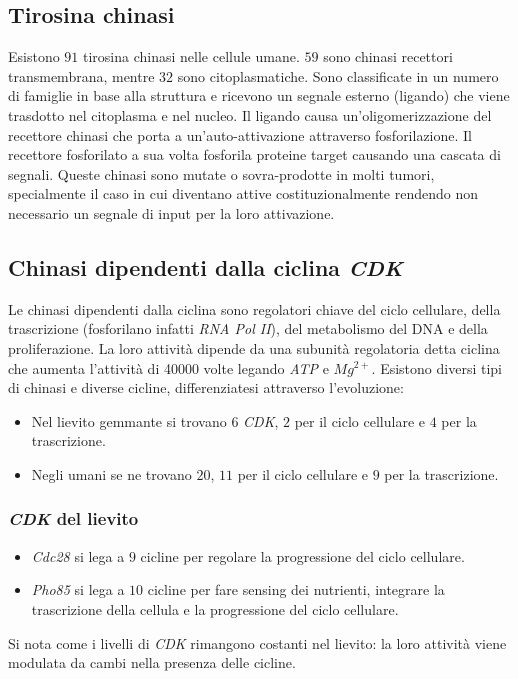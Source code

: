 	\subsection{Tirosina chinasi}
	Esistono $91$ tirosina chinasi nelle cellule umane. 
	$59$ sono chinasi recettori transmembrana, mentre $32$ sono citoplasmatiche. 
	Sono classificate in un numero di famiglie in base alla struttura e ricevono un segnale esterno (ligando) che viene trasdotto nel citoplasma e nel nucleo.
	Il ligando causa un'oligomerizzazione del recettore chinasi che porta a un'auto-attivazione attraverso fosforilazione. 
	Il recettore fosforilato a sua volta fosforila proteine target causando una cascata di segnali. 
	Queste chinasi sono mutate o sovra-prodotte in molti tumori, specialmente il caso in cui diventano attive costituzionalmente rendendo non necessario un segnale di input per la loro attivazione.

	\subsection{Chinasi dipendenti dalla ciclina \emph{CDK}}
	Le chinasi dipendenti dalla ciclina sono regolatori chiave del ciclo cellulare, della trascrizione (fosforilano infatti \emph{RNA Pol II}), del metabolismo del DNA e della proliferazione. 
	La loro attivit\`a dipende da una subunit\`a regolatoria detta ciclina che aumenta l'attivit\`a di \num{40000} volte legando \emph{ATP} e \emph{$Mg^{2+}$}.
	Esistono diversi tipi di chinasi e diverse cicline, differenziatesi attraverso l'evoluzione:
	\begin{itemize}
		\item Nel lievito gemmante si trovano $6$ \emph{CDK}, $2$ per il ciclo cellulare e $4$ per la trascrizione.
		\item Negli umani se ne trovano $20$, $11$ per il ciclo cellulare e $9$ per la trascrizione.
	\end{itemize}
		
		\subsubsection{\emph{CDK} del lievito}
		\begin{itemize}
			\item \emph{Cdc28} si lega a $9$ cicline per regolare la progressione del ciclo cellulare.
			\item \emph{Pho85} si lega a $10$ cicline per fare sensing dei nutrienti, integrare la trascrizione della cellula e la progressione del ciclo cellulare.
		\end{itemize}
		Si nota come i livelli di \emph{CDK} rimangono costanti nel lievito: la loro attivit\`a viene modulata da cambi nella presenza delle cicline.

